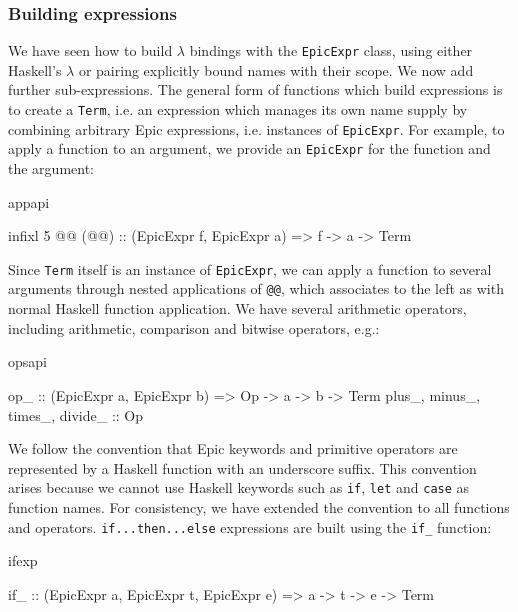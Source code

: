 \vspace*{-0.5em}
\subsubsection*{Building expressions}

We have seen how to build $\lambda$ bindings with the
\texttt{EpicExpr} class, using either Haskell's $\lambda$ or pairing
explicitly bound names with their scope. We now add further
sub-expressions.  The general form of functions which build
expressions is to create a \texttt{Term}, i.e. an expression which
manages its own name supply by combining arbitrary Epic
expressions, i.e. instances of \texttt{EpicExpr}. For example, to
apply a function to an argument, we provide an \texttt{EpicExpr} for
the function and the argument:

\begin{SaveVerbatim}{appapi}

infixl 5 @@
(@@) :: (EpicExpr f, EpicExpr a) => f -> a -> Term

\end{SaveVerbatim}

\noindent
Since \texttt{Term} itself is an instance of \texttt{EpicExpr}, we can
apply a function to several arguments through nested applications of
\texttt{@@}, which associates to the left as with normal Haskell
function application. We have several arithmetic operators, including
arithmetic, comparison and bitwise operators, e.g.:

\begin{SaveVerbatim}{opsapi}

op_ :: (EpicExpr a, EpicExpr b) => Op -> a -> b -> Term
plus_, minus_, times_, divide_ :: Op

\end{SaveVerbatim}

\noindent
We follow the convention that Epic keywords and primitive
operators are represented by a Haskell function with an underscore
suffix. This convention arises because we cannot use Haskell keywords
such as \texttt{if}, \texttt{let} and \texttt{case} as function names.
For consistency, we have extended the convention to all functions and
operators. \texttt{if...then...else} expressions are built using the
\texttt{if\_} function:

\begin{SaveVerbatim}{ifexp}

if_ :: (EpicExpr a, EpicExpr t, EpicExpr e) => a -> t -> e -> Term

\end{SaveVerbatim}

